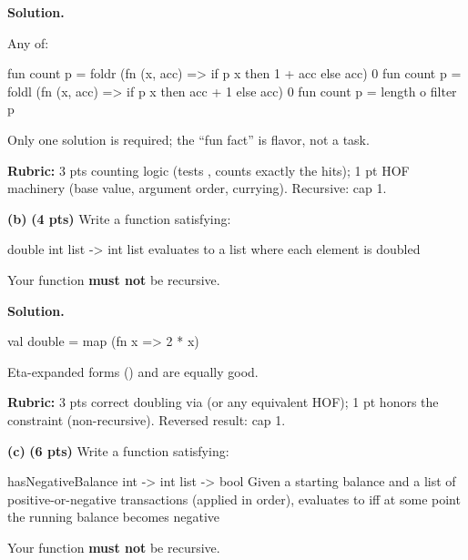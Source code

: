\documentclass[crop=false]{standalone}
\newif\ifsol
\newenvironment{solution}
    {\par\color{solution_color}\begin{framed}\textbf{Solution.}\par}
    {\end{framed}}
\newcommand{\subpts}[1]{\textbf{(#1 pts)}}
\newcommand{\answerspace}[1]{\ifsol\else\vspace{#1}\par\fi}
\begin{document}
\begin{solution}
Any of:

\begin{codeblock}
  fun count p = foldr (fn (x, acc) => if p x then 1 + acc else acc) 0
  fun count p = foldl (fn (x, acc) => if p x then acc + 1 else acc) 0
  fun count p = length o filter p
\end{codeblock}

Only one solution is required; the ``fun fact'' is flavor, not a task.

\textbf{Rubric:} 3 pts counting logic (tests , counts exactly
the hits); 1 pt HOF machinery (base value, argument order, currying).
Recursive: cap 1.
\end{solution}

\textbf{(b)} \subpts{4} Write a function  satisfying:

\spec
  {double}
  {int list -> int list}
  {}
  { evaluates to a list where each element is doubled}

\begin{constraint}
Your function \textbf{must not} be recursive.
\end{constraint}

\answerspace{4cm}

\begin{solution}
\begin{codeblock}
  val double = map (fn x => 2 * x)
\end{codeblock}

Eta-expanded forms () and
 are equally good.

\textbf{Rubric:} 3 pts correct doubling via  (or any
equivalent HOF); 1 pt honors the constraint (non-recursive). Reversed
result: cap 1.
\end{solution}

\newpage

\textbf{(c)} \subpts{6} Write a function  satisfying:

\spec
  {hasNegativeBalance}
  {int -> int list -> bool}
  {}
  {Given a starting balance and a list of positive-or-negative
  transactions  (applied in order),  evaluates to  iff at some point the running
  balance becomes negative}

\begin{constraint}
  Your function \textbf{must not} be recursive.
\end{constraint}
\end{document}
